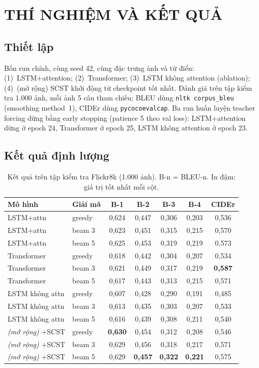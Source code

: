 \chapter{THÍ NGHIỆM VÀ KẾT QUẢ}
\label{chap:experiments}

\section{Thiết lập}

Bốn run chính, cùng seed 42, cùng đặc trưng ảnh và từ điển:
(1)~LSTM+attention; (2)~Transformer; (3)~LSTM không attention (ablation);
(4)~(mở rộng) SCST khởi động từ checkpoint tốt nhất. Đánh giá trên tập kiểm tra
1.000 ảnh, mỗi ảnh 5 câu tham chiếu; BLEU dùng \texttt{nltk corpus\_bleu}
(smoothing method~1), CIDEr dùng \texttt{pycocoevalcap}. Ba run huấn luyện
teacher forcing dừng bằng early stopping (patience 5 theo val loss): LSTM+attention
dừng ở epoch 24, Transformer ở epoch 25, LSTM không attention ở epoch 23.

\section{Kết quả định lượng}

\begin{table}[H]
	\centering
	\caption{Kết quả trên tập kiểm tra Flickr8k (1.000 ảnh). B-n = BLEU-n.
	In đậm: giá trị tốt nhất mỗi cột.}
	\label{tab:main-results}
	\begin{tabular}{llccccc}
		\hline
		\textbf{Mô hình} & \textbf{Giải mã} & \textbf{B-1} & \textbf{B-2} & \textbf{B-3} & \textbf{B-4} & \textbf{CIDEr} \\
		\hline
		LSTM+attn        & greedy   & 0,624 & 0,447 & 0,306 & 0,203 & 0,536 \\
		LSTM+attn        & beam 3   & 0,623 & 0,451 & 0,315 & 0,215 & 0,570 \\
		LSTM+attn        & beam 5   & 0,625 & 0,453 & 0,319 & 0,219 & 0,573 \\
		Transformer      & greedy   & 0,618 & 0,442 & 0,304 & 0,207 & 0,534 \\
		Transformer      & beam 3   & 0,621 & 0,449 & 0,317 & 0,219 & \textbf{0,587} \\
		Transformer      & beam 5   & 0,617 & 0,443 & 0,313 & 0,215 & 0,571 \\
		LSTM không attn  & greedy   & 0,607 & 0,428 & 0,290 & 0,191 & 0,485 \\
		LSTM không attn  & beam 3   & 0,613 & 0,435 & 0,303 & 0,207 & 0,533 \\
		LSTM không attn  & beam 5   & 0,616 & 0,439 & 0,308 & 0,211 & 0,540 \\
		\emph{(mở rộng)} +SCST & greedy & \textbf{0,630} & 0,454 & 0,312 & 0,208 & 0,546 \\
		\emph{(mở rộng)} +SCST & beam 3 & 0,629 & 0,456 & 0,318 & 0,217 & 0,571 \\
		\emph{(mở rộng)} +SCST & beam 5 & 0,629 & \textbf{0,457} & \textbf{0,322} & \textbf{0,221} & 0,575 \\
		\hline
	\end{tabular}
\end{table}

